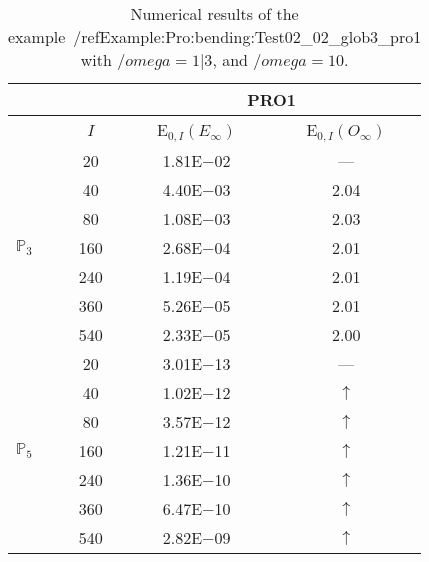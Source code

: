 \begin{table}[H]
\caption{Numerical results of the example~/ref{Example:Pro:bending:Test02_02_glob3_pro1} with $/omega=1|3$, and $/omega=10$.}
\setlength{\tabcolsep}{5pt}
\centering
\begin{tabular}{@{}l c c c@{}}
\toprule
 &  & \multicolumn{2}{c}{PRO1}\\
\midrule
 & $I$ & E$_{0,I}(E_{\infty})$ & E$_{0,I}(O_{\infty})$\\
\midrule
\multirow{7}{*}{$\mathbb{P}_{3}$}
 & 20 & 1.81E$-$02 & ---\\
 & 40 & 4.40E$-$03 & 2.04\\
 & 80 & 1.08E$-$03 & 2.03\\
 & 160 & 2.68E$-$04 & 2.01\\
 & 240 & 1.19E$-$04 & 2.01\\
 & 360 & 5.26E$-$05 & 2.01\\
 & 540 & 2.33E$-$05 & 2.00\\
\midrule
\multirow{7}{*}{$\mathbb{P}_{5}$}
 & 20 & 3.01E$-$13 & ---\\
 & 40 & 1.02E$-$12 & $\uparrow$\\
 & 80 & 3.57E$-$12 & $\uparrow$\\
 & 160 & 1.21E$-$11 & $\uparrow$\\
 & 240 & 1.36E$-$10 & $\uparrow$\\
 & 360 & 6.47E$-$10 & $\uparrow$\\
 & 540 & 2.82E$-$09 & $\uparrow$\\
\bottomrule
\end{tabular}
\label{Table:PRO:test_02_02_test12_pro1}
\end{table}
